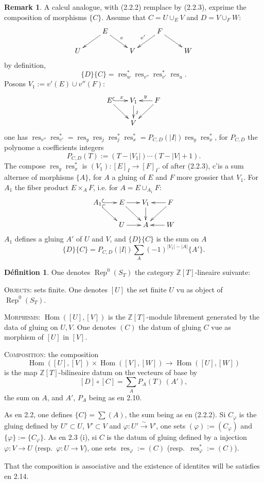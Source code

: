 \documentclass[11pt,a4paper]{article}
\theoremstyle{plain}
\theoremstyle{definition}
\newtheorem{definition}[theorem]{D\'efinition}
\newtheorem{remark}[theorem]{Remark}
\DeclareMathOperator{\Hom}{Hom}
\DeclareMathOperator{\Rep}{Rep}
\DeclareMathOperator{\res}{res}
\newcommand{\Z}{\mathbb{Z}}
\newcommand{\isom}{\xrightarrow{\sim}}
\begin{document}
\begin{remark}
A calcul analogue, with (2.2.2) remplace by (2.2.3), exprime the composition of morphisms $\{C\}$. Assume that $C = U \cup_E V$ and $D = V \cup_F W$:
\[
\xymatrix@R=1.2pc{
& E \ar[dl] \ar[dr]^{v} & & F \ar[dl]_{v'} \ar[dr] \\
U & & V & & W
}
\]
by definition,
\[
\{D\}\{C\} = \res^*_w \res_{v''} \res^*_{v'} \res_u.
\]
Posons $V_1 := v'(E) \cup v''(F)$:
\[
\xymatrix@R=1.5pc@C=1.5pc{
E \ar[dr] \ar@{^{(}->}[r]^{x} & V_1 \ar[d]^{j} & F \ar[l]_{y} \ar[dl] \\
& V
}
\]
one has $\res_{v''} \res^*_{v'} = \res_y \res_j \res^*_j \res^*_x = P_{C,D}(|I|) \res_y \res^*_x$, for $P_{C,D}$ the polynome a coefficients integers
\begin{equation}
P_{C,D}(T) := (T - |V_1|) \cdots (T - |V| + 1). \tag{2.11.1}
\end{equation}
The compose $\res_y \res^*_x$ is $(V_1) : [E]_I \to [F]_I$. of after (2.2.3), c'is a sum alternee of morphisms $\{A\}$, for $A$ a gluing of $E$ and $F$ more grossier that $V_1$. For $A_1$ the fiber product $E \times_A F$, i.e. for $A = E \cup_{A_1} F$:
\[
\xymatrix@R=1.5pc@C=1.5pc{
A_1 \ar@{^{(}->}[r] \ar@{^{(}->}[dr] & E \ar[dr] \ar[r] & V_1 \ar[d] & F \ar[l] \ar[dl] \\
& U \ar[r] & A & W \ar[l]
}
\]
$A_1$ defines a gluing $A'$ of $U$ and $V$, and $\{D\}\{C\}$ is the sum on $A$
\begin{equation}
\{D\}\{C\} = P_{C,D}(|I|) \sum_A (-1)^{|V_1| - |A|} \{A'\}. \tag{2.11.2}
\end{equation}
\end{remark}

\begin{definition}
One denotes $\Rep^0(S_T)$ the category $\Z[T]$-lineaire suivante:

\textsc{Objects}: sets finite. One denotes $[U]$ the set finite $U$ vu as object of $\Rep^0(S_T)$.

\textsc{Morphisms}: $\Hom([U], [V])$ is the $\Z[T]$-module librement generated by the data of gluing on $U, V$. One denotes $(C)$ the datum of gluing $C$ vue as morphism of $[U]$ in $[V]$.

\textsc{Composition}: the composition
\[
\Hom([U], [V]) \times \Hom([V], [W]) \to \Hom([U], [W])
\]
is the map $\Z[T]$-bilineaire datum on the vecteurs of base by
\[
[D] \circ [C] = \sum_A P_A(T)\,(A'),
\]
the sum on $A$, and $A'$, $P_A$ being as en 2.10.

As en 2.2, one defines $\{C\} = \sum (A)$, the sum being as en (2.2.2). Si $C_\varphi$ is the gluing defined by $U' \subset U$, $V' \subset V$ and $\varphi : U' \isom V'$, one sets $(\varphi) := (C_\varphi)$ and $\{\varphi\} := \{C_\varphi\}$. As en 2.3 (i), si $C$ is the datum of gluing defined by a injection $\varphi : V \to U$ (resp.~$\varphi : U \to V$), one sets $\res_\varphi := (C)$ (resp.~$\res^*_\varphi := (C)$).

That the composition is associative and the existence of identites will be satisfies en 2.14.
\end{definition}
\end{document}
